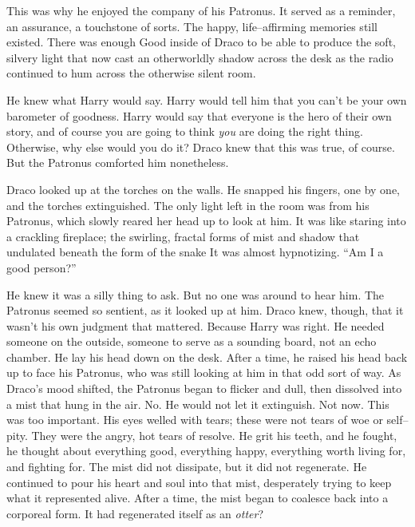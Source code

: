 
This was why he enjoyed the company of his Patronus. It served as a reminder, an assurance, a touchstone of sorts. The happy, life\mbox{--}affirming memories still existed. There was enough Good inside of Draco to be able to produce the soft, silvery light that now cast an otherworldly shadow across the desk as the radio continued to hum across the otherwise silent room.

He knew what Harry would say. Harry would tell him that you can’t be your own barometer of goodness. Harry would say that everyone is the hero of their own story, and of course you are going to think \emph{you} are doing the right thing. Otherwise, why else would you do it? Draco knew that this was true, of course. But the Patronus comforted him nonetheless.

Draco looked up at the torches on the walls. He snapped his fingers, one by one, and the torches extinguished. The only light left in the room was from his Patronus, which slowly reared her head up to look at him. It was like staring into a crackling fireplace; the swirling, fractal forms of mist and shadow that undulated beneath the form of the snake{\el} It was almost hypnotizing.
\SmallVSpace
“Am I a good person?”


He knew it was a silly thing to ask. But no one was around to hear him. The Patronus seemed so{\el} sentient, as it looked up at him. Draco knew, though, that it wasn’t his own judgment that mattered. Because Harry was right. He needed someone on the outside, someone to serve as a sounding board, not an echo chamber. He lay his head down on the desk.
\SmallVSpace
After a time, he raised his head back up to face his Patronus, who was still looking at him in that odd sort of way. As Draco’s mood shifted, the Patronus began to flicker and dull, then dissolved into a mist that hung in the air. No. He would not let it extinguish. Not now. This was too important. His eyes welled with tears; these were not tears of woe or self\mbox{--}pity. They were the angry, hot tears of resolve.
\SmallVSpace
He grit his teeth, and he fought, he thought about everything good, everything happy, everything worth living for, and fighting for. The mist did not dissipate, but it did not regenerate. He continued to pour his heart and soul into that mist, desperately trying to keep what it represented alive. After a time, the mist began to coalesce back into a corporeal form.
\SmallVSpace
It had regenerated itself{\el} as an \emph{otter}?

